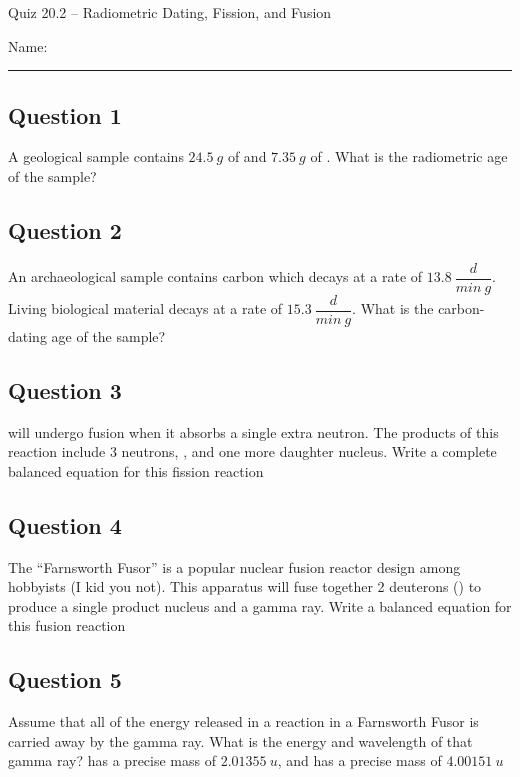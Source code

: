 \documentclass[11pt, letterpaper]{memoir}
\begin{document}
	\begin{center}
		{\large	Quiz 20.2 -- Radiometric Dating, Fission, and Fusion}
	\end{center}
	{\large Name: \rule[-1mm]{4in}{.1pt} 

\subsection*{Question 1}
A geological sample contains $24.5~g$ of  and $7.35~g$ of . What is the radiometric age of the sample?

\vspace{6em}
\subsection*{Question 2}
An archaeological sample contains carbon which decays at a rate of $13.8~\dfrac{d}{min~g}$. Living biological material decays at a rate of $15.3~\dfrac{d}{min~g}$. What is the carbon-dating age of the sample?

\vspace{5em}
\subsection*{Question 3}
 will undergo fusion when it absorbs a single extra neutron. The products of this reaction include 3 neutrons, , and one more daughter nucleus. Write a complete balanced equation for this fission reaction

\vspace{3em}
\subsection*{Question 4}
The ``Farnsworth Fusor'' is a popular nuclear fusion reactor design among hobbyists (I kid you not). This apparatus will fuse together 2 deuterons () to produce a single product nucleus and a gamma ray. Write a balanced equation for this fusion reaction

\vspace{3em}
\subsection*{Question 5}
Assume that all of the energy released in a reaction in a Farnsworth Fusor is carried away by the gamma ray. What is the energy and wavelength of that gamma ray?  has a precise mass of $2.01355~u$, and  has a precise mass of $4.00151~u$
	\newpage
	\pagestyle{empty}
	\addtocounter{page}{-1}
\newpage
{}
}
\end{document}
